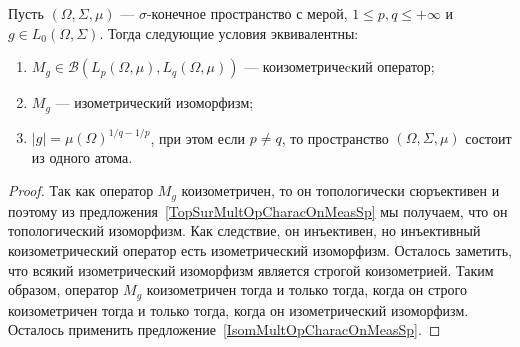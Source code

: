 \begin{proposition}\label{CoisomMultOpCharacOnMeasSp} Пусть
$(\Omega,\Sigma,\mu)$ --- $\sigma$-конечное пространство с мерой, 
$1\leq p,q\leq +\infty$ и $g\in L_0(\Omega,\Sigma)$. 
Тогда следующие условия эквивалентны:

\begin{enumerate}[label = (\roman*)]
    \item $M_g\in\mathcal{B}(L_p(\Omega,\mu),L_q(\Omega,\mu))$ --- 
    коизометричеcкий оператор;

    \item $M_g$ --- изометрический изоморфизм;

    \item $|g|={\mu(\Omega)}^{1/q-1/p}$, при этом если $p\neq q$, 
    то пространство $(\Omega,\Sigma,\mu)$ состоит из одного атома.
\end{enumerate}
\end{proposition}
\begin{proof} Так как оператор $M_g$ коизометричен, то он топологически
сюръективен и поэтому из предложения~\ref{TopSurMultOpCharacOnMeasSp} мы
получаем, что он топологический изоморфизм. Как следствие, он инъективен, но
инъективный коизометрический оператор есть изометрический изоморфизм. Осталось
заметить, что всякий изометрический изоморфизм является строгой коизометрией.
Таким образом, оператор $M_g$ коизометричен тогда и только тогда, когда он
строго коизометричен тогда и только тогда, когда он изометрический изоморфизм.
Осталось применить предложение~\ref{IsomMultOpCharacOnMeasSp}.
\end{proof}

